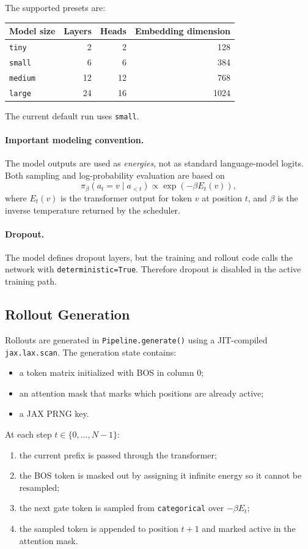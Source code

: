 \documentclass[11pt]{article}
\begin{document}
The supported presets are:
\begin{center}
\begin{tabular}{lrrr}
\toprule
Model size & Layers & Heads & Embedding dimension \\
\midrule
\texttt{tiny} & 2 & 2 & 128 \\
\texttt{small} & 6 & 6 & 384 \\
\texttt{medium} & 12 & 12 & 768 \\
\texttt{large} & 24 & 16 & 1024 \\
\bottomrule
\end{tabular}
\end{center}

The current default run uses \texttt{small}.

\paragraph{Important modeling convention.}
The model outputs are used as \emph{energies}, not as standard language-model logits. Both sampling and log-probability evaluation are based on
\[
\pi_\beta(a_t=v \mid a_{<t})
\propto
\exp(-\beta E_t(v)),
\]
where $E_t(v)$ is the transformer output for token $v$ at position $t$, and $\beta$ is the inverse temperature returned by the scheduler.

\paragraph{Dropout.}
The model defines dropout layers, but the training and rollout code calls the network with \texttt{deterministic=True}. Therefore dropout is disabled in the active training path.

\subsection{Rollout Generation}

Rollouts are generated in \texttt{Pipeline.generate()} using a JIT-compiled \texttt{jax.lax.scan}. The generation state contains:
\begin{itemize}[leftmargin=*]
\item a token matrix initialized with BOS in column $0$;
\item an attention mask that marks which positions are already active;
\item a JAX PRNG key.
\end{itemize}

At each step $t \in \{0,\dots,N-1\}$:
\begin{enumerate}[leftmargin=*]
\item the current prefix is passed through the transformer;
\item the BOS token is masked out by assigning it infinite energy so it cannot be resampled;
\item the next gate token is sampled from \texttt{categorical} over $-\beta E_t$;
\item the sampled token is appended to position $t+1$ and marked active in the attention mask.
\end{enumerate}
\end{document}
